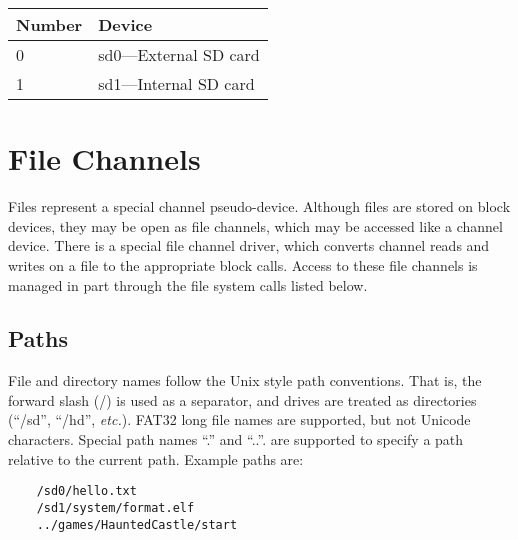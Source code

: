 \begin{tabular}{|l||l|} \hline
	Number & Device \\ \hline\hline
	0 & sd0---External SD card \\ \hline
	1 & sd1---Internal SD card \\ \hline
\end{tabular}

\section*{File Channels}
Files represent a special channel pseudo-device. Although files are stored on block devices, they may be open as file channels, which may be accessed like a channel device. There is a special file channel driver, which converts channel reads and writes on a file to the appropriate block calls. Access to these file channels is managed in part through the file system calls listed below.

\subsection*{Paths}
File and directory names follow the Unix style path conventions. That is, the forward slash (/) is used as a separator, and drives are treated as directories (``/sd'', ``/hd'', {\it etc.}). FAT32 long file names are supported, but not Unicode characters. Special path names ``.'' and ``..''. are supported to specify a path relative to the current path. Example paths are:

\begin{verbatim}
	/sd0/hello.txt
	/sd1/system/format.elf
	../games/HauntedCastle/start	
\end{verbatim}
